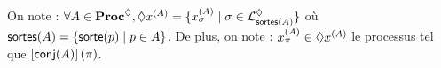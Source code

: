\newcommand{\phmtophan}{\mathsf{phm2phan}}
\newcommand{\srsymbol}{r}
\newcommand{\sr}[1]{\srsymbol^{#1}}
\newcommand{\srgsymbol}{R}
\newcommand{\srg}{\srgsymbol}
\newcommand{\scfsymbol}{f}
\newcommand{\scf}[1]{\scfsymbol^{(#1)}}
\newcommand{\scfa}{\scf{A}}
\newcommand{\scfb}{\scf{A \recouvre B}}

\newcommand{\PHssr}[1][\PHs']{#1_{\srsymbol}}
\newcommand{\PHsscfa}[1][\PHs']{#1^A_{\scfsymbol}}
\newcommand{\PHsscfb}[1][\PHs']{#1^B_{\scfsymbol}}

\newcommand{\PHhsr}[1][\PHh']{#1_{\srsymbol}}
\newcommand{\PHhscfa}[1][\PHh']{#1^A_{\scfsymbol}}
\newcommand{\PHhscfb}[1][\PHh']{#1^B_{\scfsymbol}}

\begin{definition}
  On note : $\forall A \in \mathbf{Proc}^{\lozenge}, \lozenge x^{(A)} =
  \{ x^{(A)}_\sigma \mid \sigma \in \mathcal{L}^\lozenge_{\mathsf{sortes}(A)} \}$
  où $\mathsf{sortes}(A) = \{ \mathsf{sorte}(p) \mid p \in A \}$.
  De plus, on note : $x^{(A)}_\pi \in \lozenge x^{(A)}$
  le processus tel que $\left[\mathsf{conj}(A)\right](\pi)$.


\end{definition}
